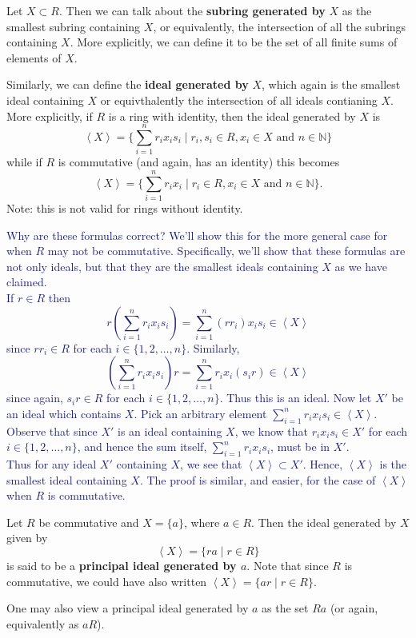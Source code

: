     Let $X \subset R$. Then we can talk about the \textbf{subring
    generated by} $X$ as the smallest subring containing $X$, or
    equivalently, the intersection of all the subrings containing
    $X$. More explicitly, we can define it to be the set of all
    finite sums of elements of $X$. 

    Similarly, we can define the \textbf{ideal generated by}
    $X$, which again is the smallest ideal containing $X$ or
    equivthalently the intersection of all ideals contianing $X$. 
    More explicitly, if $R$ is a ring with identity, then the ideal
    generated by $X$ is 
    \[
        \left< X \right> = \Big\{\sum_{i=1}^{n}r_ix_is_i \mid r_i, s_i \in R, x_i \in X \text{ and } n \in \mathbb{N}\Big\}
    \]
    while if $R$ is commutative (and again, has an identity) this becomes 
    \[
        \left< X \right>= \Big\{\sum_{i=1}^{n}r_ix_i \mid r_i \in R, x_i \in X \text{ and } n \in \mathbb{N}\Big\}.
    \]
    Note: this is not valid for rings without identity. 

    \textcolor{MidnightBlue}{Why are these formulas correct? We'll
    show this for the more general case for when $R$ may not be
    commutative. Specifically, we'll show that these formulas are
    not only ideals, but that they are the smallest ideals
    containing $X$ as we have claimed. 
    \\
    \indent If $r \in R$ then 
    \[
        r\left( \sum_{i=1}^{n}r_ix_is_i \right) = \sum_{i=1}^{n}(rr_i)x_is_i \in \left< X \right> 
    \]
    since $rr_i \in R$ for each $i \in \{1, 2, \dots, n\}$.
    Similarly, 
    \[
        \left( \sum_{i=1}^{n}r_ix_is_i \right)r = \sum_{i=1}^{n}r_ix_i(s_ir) \in \left< X \right> 
    \]
    since again, $s_ir \in R$ for each $i \in \{1, 2, \dots, n\}$.
    Thus this is an ideal. Now let $X'$ be an ideal which contains
    $X$. Pick an arbitrary element $\displaystyle \sum_{i=1}^{n}r_ix_is_i \in
    \left< X \right>$. Observe that since $X'$ is an ideal
    containing $X$, we know that $r_ix_is_i \in X'$ for each $i
    \in \{1, 2, \dots, n\}$, and hence the sum itself,
    $\sum_{i=1}^{n}r_ix_is_i$, must be in $X'$. 
    \\
    \indent Thus for any ideal $X'$ containing $X$, we see that $\left< X
    \right> \subset X'$. Hence, $\left< X \right>$ is the smallest
    ideal containing $X$. The proof is similar, and easier, for
    the case of $\left< X \right>$ when $R$ is commutative.
    }

    \begin{definition}
        Let $R$ be commutative and $X = \{a\}$, where $a \in R$.
        Then the ideal generated by $X$ given by 
        \[
            \left< X \right> = \{ra \mid r \in R\}
        \]
        is said to be a \textbf{principal ideal generated by $a$}.
        Note that since $R$ is commutative, we could have also
        written $\left< X \right> = \{ar \mid r \in R\}$.

        One may also view a principal ideal generated by $a$ as
        the set $Ra$ (or again, equivalently as $aR$).
    \end{definition}

